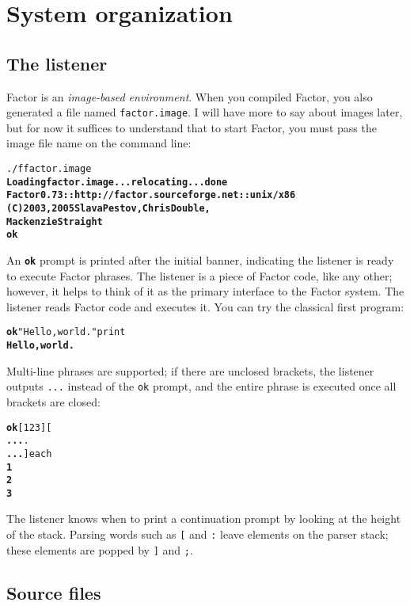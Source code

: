 \documentclass{report}
\begin{document}
\section{System organization}

\subsection{The listener}

Factor is an \emph{image-based environment}. When you compiled Factor, you also generated a file named \texttt{factor.image}. I will have more to say about images later, but for now it suffices to understand that to start Factor, you must pass the image file name on the command line:
\begin{alltt}
./f factor.image
\textbf{Loading factor.image... relocating... done
Factor 0.73 :: http://factor.sourceforge.net :: unix/x86
(C) 2003, 2005 Slava Pestov, Chris Double,
Mackenzie Straight
ok}
\end{alltt}
An \texttt{\textbf{ok}} prompt is printed after the initial banner, indicating the listener is ready to execute Factor phrases. The listener is a piece of Factor code, like any other; however, it helps to think of it as the primary interface to the Factor system. The listener reads Factor code and executes it. You can try the classical first program:

\begin{alltt}
\textbf{ok} "Hello, world." print
\textbf{Hello, world.}
\end{alltt}


Multi-line phrases are supported; if there are unclosed brackets, the listener outputs \texttt{...} instead of the \texttt{ok} prompt, and the entire phrase is executed once all brackets are closed:

\begin{alltt}
\textbf{ok} [ 1 2 3 ] [
\textbf{...} .
\textbf{...} ] each
\textbf{1
2
3}
\end{alltt}

The listener knows when to print a continuation prompt by looking at the height of the
stack. Parsing words such as \texttt{[} and \texttt{:} leave elements on the parser
stack; these elements are popped by \texttt{]} and \texttt{;}.

\subsection{Source files}
\end{document}
